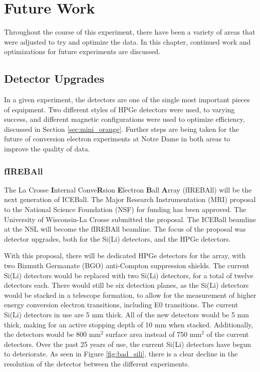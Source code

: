 
%
%

\chapter{Future Work}

Throughout the course of this experiment, there have been a variety of areas that were adjusted to try and optimize the data. In this chapter, continued work and optimizations for future experiments are discussed.

\section{Detector Upgrades}

In a given experiment, the detectors are one of the single most important pieces of equipment. Two different styles of HPGe detectors were used, to varying success, and different magnetic configurations were used to optimize efficiency, discussed in Section \ref{sec:mini_orange}. Further steps are being taken for the future of conversion electron experiments at Notre Dame in both areas to improve the quality of data.

\subsection{fIREBAll}

The La Crosse \textbf{I}nternal Conve\textbf{R}sion \textbf{E}lectron \textbf{B}all \textbf{A}rray (fIREBAll) will be the next generation of ICEBall\citep{lesher19:_fireball}. The Major Research Instrumentation (MRI) proposal to the National Science Foundation (NSF) for funding has been approved. The University of Wisconsin-La Crosse submitted the proposal. The ICEBall beamline at the NSL will become the fIREBAll beamline. The focus of the proposal was detector upgrades, both for the Si(Li) detectors, and the HPGe detectors.

With this proposal, there will be dedicated HPGe detectors for the array, with two Bizmuth Germanate (BGO) anti-Compton suppression shields. The current Si(Li) detectors would be replaced with two Si(Li) detectors, for a total of twelve detectors each. There would still be six detection planes, as the Si(Li) detectors would be stacked in a telescope formation, to allow for the measurement of higher energy conversion electron transitions, including E0 transitions. The current Si(Li) detectors in use are 5 mm thick. All of the new detectors would be 5 mm thick, making for an active stopping depth of 10 mm when stacked. Additionally, the detectors would be 800 mm$^2$ surface area instead of 750 mm$^2$ of the current detectors. Over the past 25 years of use, the current Si(Li) detectors have begun to deteriorate. As seen in Figure \ref{fig:bad_sili}, there is a clear decline in the resolution of the detector between the different experiments.

